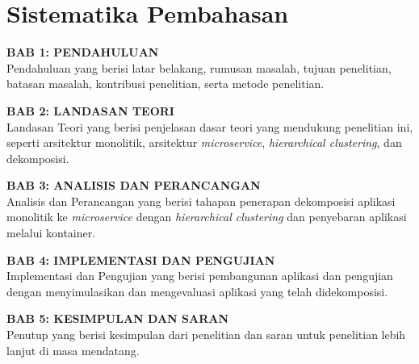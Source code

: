 \section{Sistematika Pembahasan}

\textbf{BAB 1: PENDAHULUAN} \\
Pendahuluan yang berisi latar belakang, rumusan masalah, tujuan penelitian, batasan masalah, kontribusi penelitian, serta metode penelitian.

\textbf{BAB 2: LANDASAN TEORI}\\
Landasan Teori yang berisi penjelasan dasar teori yang mendukung penelitian ini, seperti arsitektur monolitik, arsitektur \textit{microservice}, \textit{hierarchical clustering}, dan dekomposisi.

\textbf{BAB 3: ANALISIS DAN PERANCANGAN}\\
Analisis dan Perancangan yang berisi tahapan penerapan dekomposisi aplikasi monolitik ke \textit{microservice} dengan \textit{hierarchical clustering} dan penyebaran aplikasi melalui kontainer.

\textbf{BAB 4: IMPLEMENTASI DAN PENGUJIAN}\\
Implementasi dan Pengujian yang berisi pembangunan aplikasi dan pengujian dengan menyimulasikan dan mengevaluasi aplikasi yang telah didekomposisi.

\textbf{BAB 5: KESIMPULAN DAN SARAN}\\
Penutup yang berisi kesimpulan dari penelitian dan saran untuk penelitian lebih lanjut di masa mendatang.